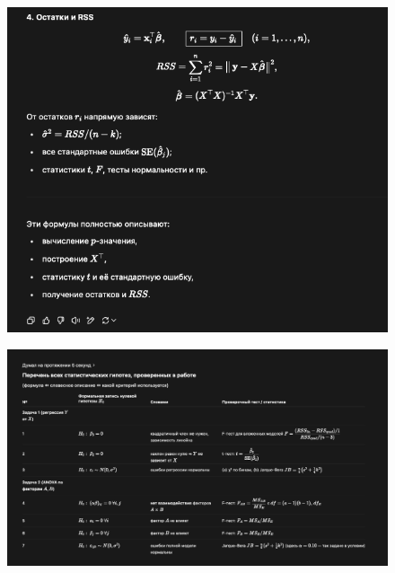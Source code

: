 \documentclass[12pt]{article}
\begin{document}
\newpage
\begin{figure}[H]
    \centering
    \includegraphics[width=1\linewidth]{image copy 4.png}
\end{figure}
\newpage
\begin{figure}[H]
    \centering
    \includegraphics[width=1\linewidth]{image copy 5.png}
\end{figure}
\newpage
\end{document}
